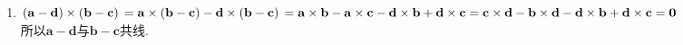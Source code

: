 \documentclass[UTF8]{ctexart}
\begin{document}
\begin{enumerate}
\item $\left(\mathbf{a}-\mathbf{d}\right)\times\left(\mathbf{b}-\mathbf{c}\right)\\
=\mathbf{a}\times\left(\mathbf{b}-\mathbf{c}\right)-\mathbf{d}\times\left(\mathbf{b}-\mathbf{c}\right)\\
=\mathbf{a}\times\mathbf{b}-\mathbf{a}\times\mathbf{c}-\mathbf{d}\times\mathbf{b}+\mathbf{d}\times\mathbf{c}\\
=\mathbf{c}\times\mathbf{d}-\mathbf{b}\times\mathbf{d}-\mathbf{d}\times\mathbf{b}+\mathbf{d}\times\mathbf{c}\\
=\mathbf{0}$\\
所以$\mathbf{a}-\mathbf{d}$与$\mathbf{b}-\mathbf{c}$共线. 


\end{enumerate}

\end{document}
